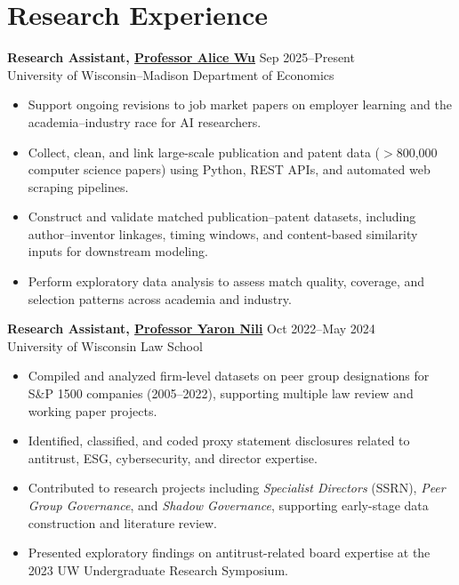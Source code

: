 \documentclass[10.5pt]{article} %
\begin{document}
\section*{Research Experience}

\textbf{Research Assistant, \href{https://www.alicewu.io/}{Professor Alice Wu}} \hfill Sep 2025--Present \\
University of Wisconsin--Madison Department of Economics
\begin{itemize}
    \item Support ongoing revisions to job market papers on employer learning and the academia--industry race for AI researchers.
    \item Collect, clean, and link large-scale publication and patent data ($>$800{,}000 computer science papers) using Python, REST APIs, and automated web scraping pipelines.
    \item Construct and validate matched publication--patent datasets, including author--inventor linkages, timing windows, and content-based similarity inputs for downstream modeling.
    \item Perform exploratory data analysis to assess match quality, coverage, and selection patterns across academia and industry.
\end{itemize}

\vspace{2pt} %
\noindent\textbf{Research Assistant, \href{https://law.duke.edu/fac/nili}{Professor Yaron Nili}} \hfill Oct 2022--May 2024 \\
University of Wisconsin Law School
\begin{itemize}
    \item Compiled and analyzed firm-level datasets on peer group designations for S\&P 1500 companies (2005--2022), supporting multiple law review and working paper projects.
    \item Identified, classified, and coded proxy statement disclosures related to antitrust, ESG, cybersecurity, and director expertise.
    \item Contributed to research projects including \textit{Specialist Directors} (SSRN), \textit{Peer Group Governance}, and \textit{Shadow Governance}, supporting early-stage data construction and literature review.
    \item Presented exploratory findings on antitrust-related board expertise at the 2023 UW Undergraduate Research Symposium.
\end{itemize}
\end{document}
